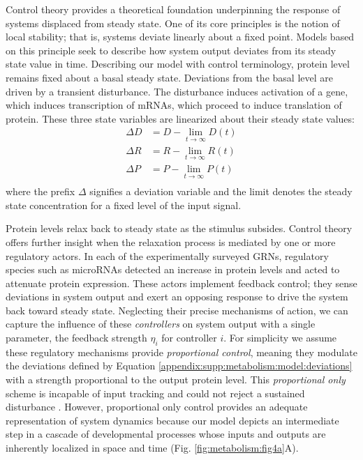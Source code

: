 Control theory provides a theoretical foundation underpinning the response of systems displaced from steady state. One of its core principles is the notion of local stability; that is, systems deviate linearly about a fixed point. Models based on this principle seek to describe how system output deviates from its steady state value in time. Describing our model with control terminology, protein level remains fixed about a basal steady state. Deviations from the basal level are driven by a transient disturbance. The disturbance induces activation of a gene, which induces transcription of mRNAs, which proceed to induce translation of protein. These three state variables are linearized about their steady state values:
\begin{equation}
\label{appendix:supp:metabolism:model:deviations}
\begin{aligned}
\Delta D &= D - \lim_{t \to \infty} D(t) \\
\Delta R &= R - \lim_{t \to \infty} R(t) \\
\Delta P &= P - \lim_{t \to \infty} P(t) \\
\end{aligned}
\end{equation}
where the prefix $\Delta$ signifies a deviation variable and the limit denotes the steady state concentration for a fixed level of the input signal.

Protein levels relax back to steady state as the stimulus subsides. Control theory offers further insight when the relaxation process is mediated by one or more regulatory actors. In each of the experimentally surveyed GRNs, regulatory species such as microRNAs detected an increase in protein levels and acted to attenuate protein expression. These actors implement feedback control; they sense deviations in system output and exert an opposing response to drive the system back toward steady state. Neglecting their precise mechanisms of action, we can capture the influence of these \emph{controllers} on system output with a single parameter, the feedback strength $\eta_i$ for controller $i$. For simplicity we assume these regulatory mechanisms provide \emph{proportional control}, meaning they modulate the deviations defined by Equation \ref{appendix:supp:metabolism:model:deviations} with a strength proportional to the output protein level. This \emph{proportional only} scheme is incapable of input tracking and could not reject a sustained disturbance \cite{Yi2000}. However, proportional only control provides an adequate representation of system dynamics because our model depicts an intermediate step in a cascade of developmental processes whose inputs and outputs are inherently localized in space and time (Fig. \ref{fig:metabolism:fig4a}A).


